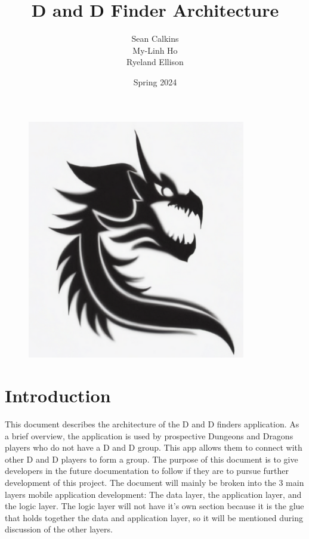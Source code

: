 \documentclass{article}
\title{D and D Finder Architecture}
\author{Sean Calkins \\ My-Linh Ho \\ Ryeland Ellison}
\date{Spring 2024}
\begin{document}
	\begin{figure}
		\centering
		\includegraphics[width=0.85\textwidth]{dd_dragon.png}
	\end{figure}

\maketitle
\newpage
	\section{Introduction}
	This document describes the architecture of the D and D finders application. As a brief 
	overview, the application is used by prospective Dungeons and Dragons players who do not
	have a D and D group. This app allows them to connect with other D and D players to form
	a group.
	The purpose of this document is to give developers in the future documentation to follow if they
	are to pursue further development of this project. The document will mainly be broken into the 
	3 main layers mobile application development: The data layer, the application layer, and the logic
	layer. The logic layer will not have it's own section because it is the glue that holds together 
	the data and application layer, so it will be mentioned during discussion of the other layers. 
\end{document}
